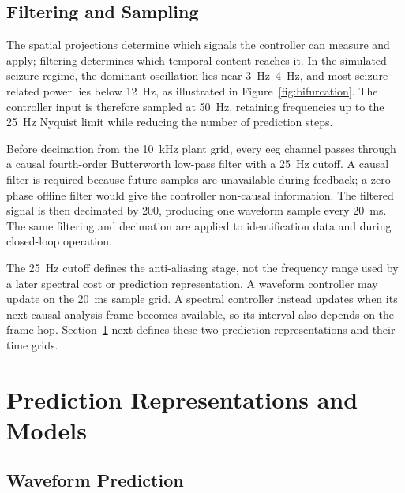 \subsection{Filtering and Sampling}

The spatial projections determine which signals the controller can measure and apply;
filtering determines which temporal content reaches it. In the simulated seizure regime,
the dominant oscillation lies near \SIrange{3}{4}{\hertz}, and most seizure-related power
lies below \SI{12}{\hertz}, as illustrated in Figure~\ref{fig:bifurcation}. The controller input is
therefore sampled at \SI{50}{\hertz}, retaining frequencies up to the
\SI{25}{\hertz} Nyquist limit while reducing the number of prediction steps.

Before decimation from the \SI{10}{\kilo\hertz} plant grid, every \ac{eeg} channel passes
through a causal fourth-order Butterworth low-pass filter with a \SI{25}{\hertz} cutoff.
A causal filter is required because future samples are unavailable during feedback; a
zero-phase offline filter would give the controller non-causal information. The filtered
signal is then decimated by 200, producing one waveform sample every
\SI{20}{\milli\second}. The same filtering and decimation are applied to identification
data and during closed-loop operation.

The \SI{25}{\hertz} cutoff defines the anti-aliasing stage, not the frequency range used by
a later spectral cost or prediction representation. A waveform controller may update on
the \SI{20}{\milli\second} sample grid. A spectral controller instead updates when its next
causal analysis frame becomes available, so its interval also depends on the frame hop.
Section~\ref{sec:prediction_representations} next defines these two prediction
representations and their time grids.

\section{Prediction Representations and Models}
\label{sec:prediction_representations}

\subsection{Waveform Prediction}

